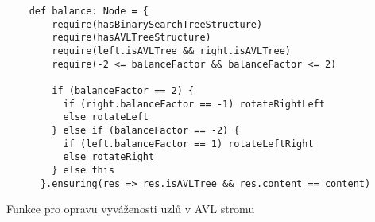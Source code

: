 \begin{listing}[H]
  \begin{verbatim}
    def balance: Node = {
        require(hasBinarySearchTreeStructure)
        require(hasAVLTreeStructure)
        require(left.isAVLTree && right.isAVLTree)
        require(-2 <= balanceFactor && balanceFactor <= 2)

        if (balanceFactor == 2) {
          if (right.balanceFactor == -1) rotateRightLeft
          else rotateLeft
        } else if (balanceFactor == -2) {
          if (left.balanceFactor == 1) rotateLeftRight
          else rotateRight
        } else this
      }.ensuring(res => res.isAVLTree && res.content == content)
  \end{verbatim}
  \caption{Funkce pro opravu vyváženosti uzlů v AVL stromu}
  \label{lst:stainless-avl-balance}
\end{listing}
